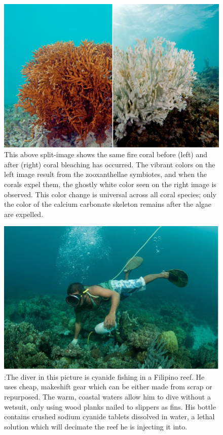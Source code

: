 \documentclass{book}\usepackage{knitr}
\begin{document}
\begin{knitrout}
\begin{kframe}
\begin{figure}
\includegraphics[width=\linewidth]{images/coralbleach}
\caption{This above split-image shows the same fire coral before (left) and after (right) coral bleaching has occurred. The vibrant colors on the left image result from the zooxanthellae symbiotes, and when the corals expel them, the ghostly white color seen on the right image is observed. This color change is universal across all coral species; only the color of the calcium carbonate skeleton remains after the algae are expelled.}
\label{fig:Coral Bleaching}
\end{figure}

\begin{figure}
\includegraphics[width=\linewidth]{images/cyanidefishing}
\caption{:The diver in this picture is cyanide fishing in a Filipino reef. He uses cheap, makeshift gear which can be either made from scrap or repurposed. The warm, coastal waters allow him to dive without a wetsuit, only using wood planks nailed to slippers as fins. His bottle contains crushed sodium cyanide tablets dissolved in water, a lethal solution which will decimate the reef he is injecting it into.}
\label{fig:Cyanide Fishing}
\end{figure}


\end{kframe}
\end{knitrout}
\end{document}
